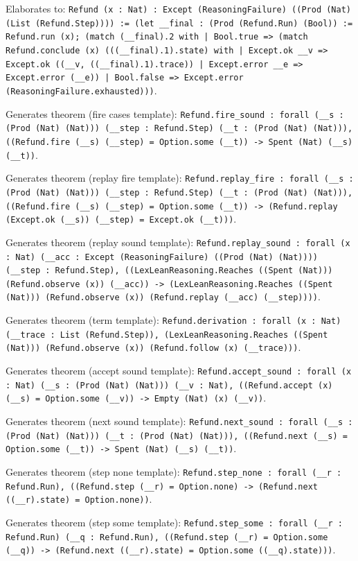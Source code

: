 \documentclass[11pt]{article}
\begin{document}
\noindent Elaborates to: \texttt{Refund (x : Nat) : Except (ReasoningFailure) ((Prod (Nat) (List (Refund.Step)))) := (let \_\_final : (Prod (Refund.Run) (Bool)) := Refund.run (x); (match (\_\_final).2 with | Bool.true => (match Refund.conclude (x) (((\_\_final).1).state) with | Except.ok \_\_v => Except.ok ((\_\_v, ((\_\_final).1).trace)) | Except.error \_\_e => Except.error (\_\_e)) | Bool.false => Except.error (ReasoningFailure.exhausted)))}.\par
\noindent Generates theorem (fire cases template): \texttt{Refund.fire\_sound : forall (\_\_s : (Prod (Nat) (Nat))) (\_\_step : Refund.Step) (\_\_t : (Prod (Nat) (Nat))), ((Refund.fire (\_\_s) (\_\_step) = Option.some (\_\_t)) -> Spent (Nat) (\_\_s) (\_\_t))}.\par
\noindent Generates theorem (replay fire template): \texttt{Refund.replay\_fire : forall (\_\_s : (Prod (Nat) (Nat))) (\_\_step : Refund.Step) (\_\_t : (Prod (Nat) (Nat))), ((Refund.fire (\_\_s) (\_\_step) = Option.some (\_\_t)) -> (Refund.replay (Except.ok (\_\_s)) (\_\_step) = Except.ok (\_\_t)))}.\par
\noindent Generates theorem (replay sound template): \texttt{Refund.replay\_sound : forall (x : Nat) (\_\_acc : Except (ReasoningFailure) ((Prod (Nat) (Nat)))) (\_\_step : Refund.Step), ((LexLeanReasoning.Reaches ((Spent (Nat))) (Refund.observe (x)) (\_\_acc)) -> (LexLeanReasoning.Reaches ((Spent (Nat))) (Refund.observe (x)) (Refund.replay (\_\_acc) (\_\_step))))}.\par
\noindent Generates theorem (term template): \texttt{Refund.derivation : forall (x : Nat) (\_\_trace : List (Refund.Step)), (LexLeanReasoning.Reaches ((Spent (Nat))) (Refund.observe (x)) (Refund.follow (x) (\_\_trace)))}.\par
\noindent Generates theorem (accept sound template): \texttt{Refund.accept\_sound : forall (x : Nat) (\_\_s : (Prod (Nat) (Nat))) (\_\_v : Nat), ((Refund.accept (x) (\_\_s) = Option.some (\_\_v)) -> Empty (Nat) (x) (\_\_v))}.\par
\noindent Generates theorem (next sound template): \texttt{Refund.next\_sound : forall (\_\_s : (Prod (Nat) (Nat))) (\_\_t : (Prod (Nat) (Nat))), ((Refund.next (\_\_s) = Option.some (\_\_t)) -> Spent (Nat) (\_\_s) (\_\_t))}.\par
\noindent Generates theorem (step none template): \texttt{Refund.step\_none : forall (\_\_r : Refund.Run), ((Refund.step (\_\_r) = Option.none) -> (Refund.next ((\_\_r).state) = Option.none))}.\par
\noindent Generates theorem (step some template): \texttt{Refund.step\_some : forall (\_\_r : Refund.Run) (\_\_q : Refund.Run), ((Refund.step (\_\_r) = Option.some (\_\_q)) -> (Refund.next ((\_\_r).state) = Option.some ((\_\_q).state)))}.\par
\end{document}
